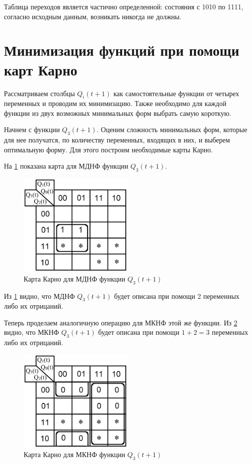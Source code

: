 \documentclass[14pt, a4paper]{extreport}
\begin{document}
Таблица переходов является частично определенной: состояния с 1010 по 1111, согласно исходным данным, возникать никогда не должны.

\section{Минимизация функций при помощи карт Карно}
Рассматриваем столбцы $Q_i(t + 1)$ как самостоятельные функции от четырех переменных и проводим их минимизацию. Также необходимо для каждой функции из двух возможных минимальных форм выбрать самую короткую.

Начнем с функции $Q_3(t + 1)$. Оценим сложность минимальных форм, которые для нее получатся, по количеству переменных, входящих в них, и выберем оптимальную форму. Для этого построим необходимые карты Карно.

На \cref{fig:map-mdnf-q3} показана карта для МДНФ функции $Q_3(t + 1)$.

\begin{figure}[H]
	\caption{Карта Карно для МДНФ функции $Q_3(t + 1)$}
	\label{fig:map-mdnf-q3}
	\includegraphics[width=0.5\textwidth]{map-mdnf-q3-selected}
\end{figure}

Из \cref{fig:map-mdnf-q3} видно, что МДНФ $Q_3(t + 1)$ будет описана при помощи 2 переменных либо их отрицаний.

Теперь проделаем аналогичную операцию для МКНФ этой же функции. Из \cref{fig:map-mknf-q3} видно, что МКНФ $Q_3(t + 1)$ будет описана при помощи $1 + 2 = 3$ переменных либо их отрицаний.

\begin{figure}[H]
	\caption{Карта Карно для МКНФ функции $Q_3(t + 1)$}
	\label{fig:map-mknf-q3}
	\includegraphics[width=0.5\textwidth]{map-mknf-q3-selected}
\end{figure}
\end{document}
